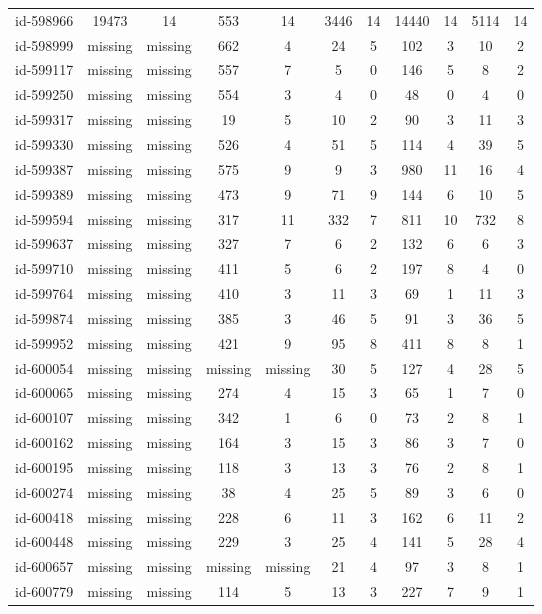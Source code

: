 \begin{tabular}{ccccccccccc}
id-598966 & 19473 & 14 & 553 & 14 & 3446 & 14 & 14440 & 14 & 5114 & 14\\
id-598999 & missing & missing & 662 & 4 & 24 & 5 & 102 & 3 & 10 & 2\\
id-599117 & missing & missing & 557 & 7 & 5 & 0 & 146 & 5 & 8 & 2\\
id-599250 & missing & missing & 554 & 3 & 4 & 0 & 48 & 0 & 4 & 0\\
id-599317 & missing & missing & 19 & 5 & 10 & 2 & 90 & 3 & 11 & 3\\
id-599330 & missing & missing & 526 & 4 & 51 & 5 & 114 & 4 & 39 & 5\\
id-599387 & missing & missing & 575 & 9 & 9 & 3 & 980 & 11 & 16 & 4\\
id-599389 & missing & missing & 473 & 9 & 71 & 9 & 144 & 6 & 10 & 5\\
id-599594 & missing & missing & 317 & 11 & 332 & 7 & 811 & 10 & 732 & 8\\
id-599637 & missing & missing & 327 & 7 & 6 & 2 & 132 & 6 & 6 & 3\\
id-599710 & missing & missing & 411 & 5 & 6 & 2 & 197 & 8 & 4 & 0\\
id-599764 & missing & missing & 410 & 3 & 11 & 3 & 69 & 1 & 11 & 3\\
id-599874 & missing & missing & 385 & 3 & 46 & 5 & 91 & 3 & 36 & 5\\
id-599952 & missing & missing & 421 & 9 & 95 & 8 & 411 & 8 & 8 & 1\\
id-600054 & missing & missing & missing & missing & 30 & 5 & 127 & 4 & 28 & 5\\
id-600065 & missing & missing & 274 & 4 & 15 & 3 & 65 & 1 & 7 & 0\\
id-600107 & missing & missing & 342 & 1 & 6 & 0 & 73 & 2 & 8 & 1\\
id-600162 & missing & missing & 164 & 3 & 15 & 3 & 86 & 3 & 7 & 0\\
id-600195 & missing & missing & 118 & 3 & 13 & 3 & 76 & 2 & 8 & 1\\
id-600274 & missing & missing & 38 & 4 & 25 & 5 & 89 & 3 & 6 & 0\\
id-600418 & missing & missing & 228 & 6 & 11 & 3 & 162 & 6 & 11 & 2\\
id-600448 & missing & missing & 229 & 3 & 25 & 4 & 141 & 5 & 28 & 4\\
id-600657 & missing & missing & missing & missing & 21 & 4 & 97 & 3 & 8 & 1\\
id-600779 & missing & missing & 114 & 5 & 13 & 3 & 227 & 7 & 9 & 1\\

\end{tabular}
